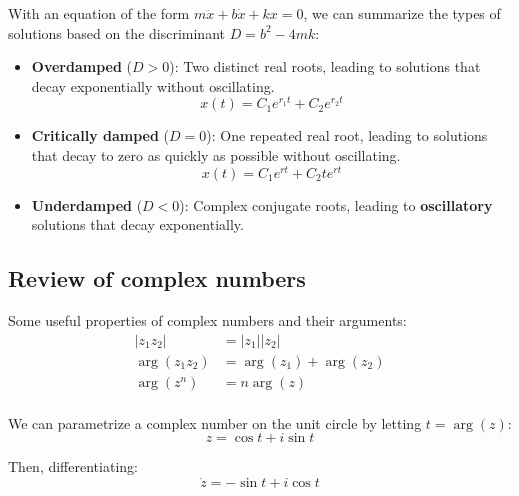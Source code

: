 With an equation of the form $m \ddot x + b \dot x + kx = 0$, we can summarize the types of solutions based on the discriminant $D = b^2 - 4mk$:
\begin{itemize}
    \item \textbf{Overdamped} ($D > 0$): Two distinct real roots, leading to solutions that decay exponentially without oscillating.
    \[
        x(t) = C_1 e^{r_1 t} + C_2 e^{r_2 t}
    \]
    \item \textbf{Critically damped} ($D = 0$): One repeated real root, leading to solutions that decay to zero as quickly as possible without oscillating.
    \[
        x(t) = C_1 e^{r t} + C_2 t e^{r t}
    \]
    \item \textbf{Underdamped} ($D < 0$): Complex conjugate roots, leading to \textbf{oscillatory} solutions that decay exponentially.
\end{itemize}

\subsection{Review of complex numbers}


Some useful properties of complex numbers and their arguments:
\begin{align*}
    | z_1 z_2 | &= |z_1| |z_2| \\
    \arg(z_1 z_2) &= \arg(z_1) + \arg(z_2) \\
    \arg(z^n) &= n \arg(z) \\
\end{align*}


We can parametrize a complex number on the unit circle by letting $t = \arg(z)$:
\begin{equation*}
z = \cos t + i \sin t
\end{equation*}

Then, differentiating:
\begin{equation*}
\dot z = -\sin t + i \cos t
\end{equation*}

